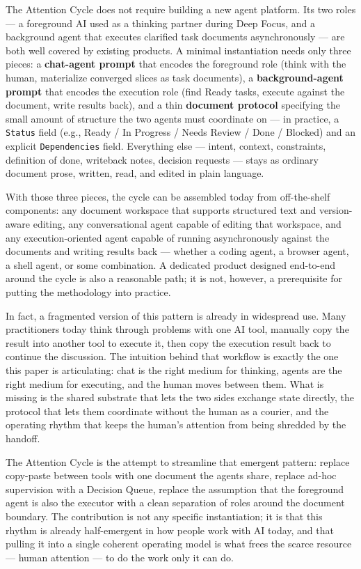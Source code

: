 \documentclass[
  nonatbib,
  preprint]{article}
\begin{document}
The Attention Cycle does not require building a new agent platform. Its
two roles --- a foreground AI used as a thinking partner during Deep
Focus, and a background agent that executes clarified task documents
asynchronously --- are both well covered by existing products. A minimal
instantiation needs only three pieces: a \textbf{chat-agent prompt} that
encodes the foreground role (think with the human, materialize converged
slices as task documents), a \textbf{background-agent prompt} that
encodes the execution role (find Ready tasks, execute against the
document, write results back), and a thin \textbf{document protocol}
specifying the small amount of structure the two agents must coordinate
on --- in practice, a \texttt{Status} field (e.g., Ready / In Progress /
Needs Review / Done / Blocked) and an explicit \texttt{Dependencies}
field. Everything else --- intent, context, constraints, definition of
done, writeback notes, decision requests --- stays as ordinary document
prose, written, read, and edited in plain language.

With those three pieces, the cycle can be assembled today from
off-the-shelf components: any document workspace that supports
structured text and version-aware editing, any conversational agent
capable of editing that workspace, and any execution-oriented agent
capable of running asynchronously against the documents and writing
results back --- whether a coding agent, a browser agent, a shell agent,
or some combination. A dedicated product designed end-to-end around the
cycle is also a reasonable path; it is not, however, a prerequisite for
putting the methodology into practice.

In fact, a fragmented version of this pattern is already in widespread
use. Many practitioners today think through problems with one AI tool,
manually copy the result into another tool to execute it, then copy the
execution result back to continue the discussion. The intuition behind
that workflow is exactly the one this paper is articulating: chat is the
right medium for thinking, agents are the right medium for executing,
and the human moves between them. What is missing is the shared
substrate that lets the two sides exchange state directly, the protocol
that lets them coordinate without the human as a courier, and the
operating rhythm that keeps the human's attention from being shredded by
the handoff.

The Attention Cycle is the attempt to streamline that emergent pattern:
replace copy-paste between tools with one document the agents share,
replace ad-hoc supervision with a Decision Queue, replace the assumption
that the foreground agent is also the executor with a clean separation
of roles around the document boundary. The contribution is not any
specific instantiation; it is that this rhythm is already half-emergent
in how people work with AI today, and that pulling it into a single
coherent operating model is what frees the scarce resource --- human
attention --- to do the work only it can do.
\end{document}
